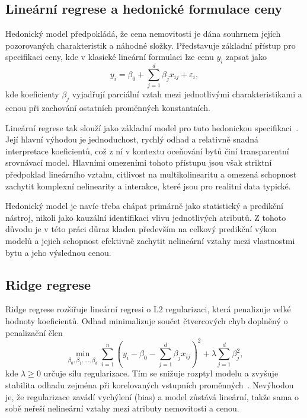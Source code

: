 \subsection*{Lineární regrese a hedonické formulace ceny}
\label{subsec:linear_regression_theory}

Hedonický model předpokládá, že cena nemovitosti je dána souhrnem jejích pozorovaných charakteristik a náhodné složky. Představuje základní přístup pro specifikaci ceny, kde v klasické lineární formulaci lze cenu $y_i$ zapsat jako
\begin{equation}
    y_i = \beta_0 + \sum_{j=1}^{d}\beta_j x_{ij} + \varepsilon_i,
\end{equation}
kde koeficienty $\beta_j$ vyjadřují parciální vztah mezi jednotlivými charakteristikami a cenou při zachování ostatních proměnných konstantních.

Lineární regrese tak slouží jako základní model pro tuto hedonickou specifikaci~\cite{Weisberg2014Applied}. Její hlavní výhodou je jednoduchost, rychlý odhad a relativně snadná interpretace koeficientů, což z ní v kontextu oceňování bytů činí transparentní srovnávací model. Hlavními omezeními tohoto přístupu jsou však striktní předpoklad lineárního vztahu, citlivost na multikolinearitu a omezená schopnost zachytit komplexní nelinearity a interakce, které jsou pro realitní data typické.

Hedonický model je navíc třeba chápat primárně jako statistický a predikční nástroj, nikoli jako kauzální identifikaci vlivu jednotlivých atributů. Z tohoto důvodu je v této práci důraz kladen především na celkový predikční výkon modelů a jejich schopnost efektivně zachytit nelineární vztahy mezi vlastnostmi bytu a jeho výslednou cenou.

\subsection*{Ridge regrese}
\label{subsec:ridge_regression_theory}

Ridge regrese rozšiřuje lineární regresi o L2 regularizaci, která penalizuje velké hodnoty koeficientů. Odhad minimalizuje součet čtvercových chyb doplněný o penalizační člen
\begin{equation}
    \min_{\beta_0,\beta_1,\ldots,\beta_d}
    \sum_{i=1}^{n}\left(y_i - \beta_0 - \sum_{j=1}^{d}\beta_j x_{ij}\right)^2
    + \lambda \sum_{j=1}^{d}\beta_j^2,
\end{equation}
kde \(\lambda \geq 0\) určuje sílu regularizace. Tím se snižuje rozptyl modelu a zvyšuje stabilita odhadu zejména při korelovaných vstupních proměnných~\cite{HoerlKennard1970}. Nevýhodou je, že regularizace zavádí vychýlení (bias) a model zůstává lineární, takže sama o sobě neřeší nelineární vztahy mezi atributy nemovitosti a cenou.


